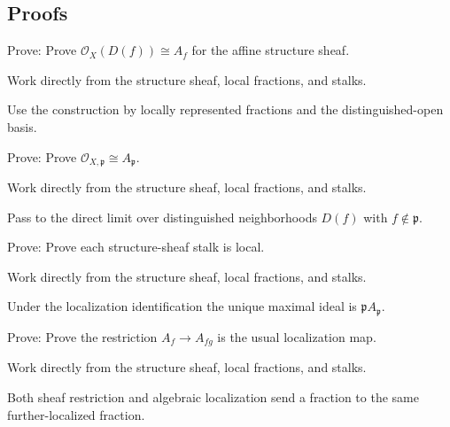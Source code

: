 \subsection*{Proofs}

\begin{exercise}\label{exr:vi17-expand-06}
Prove: Prove $\mathcal O_X(D(f))\cong A_f$ for the affine structure sheaf.
\end{exercise}
\begin{hint}
Work directly from the structure sheaf, local fractions, and stalks.
\end{hint}
\begin{solution}
Use the construction by locally represented fractions and the distinguished-open basis.
\end{solution}

\begin{exercise}\label{exr:vi17-expand-07}
Prove: Prove $\mathcal O_{X,\mathfrak p}\cong A_{\mathfrak p}$.
\end{exercise}
\begin{hint}
Work directly from the structure sheaf, local fractions, and stalks.
\end{hint}
\begin{solution}
Pass to the direct limit over distinguished neighborhoods $D(f)$ with $f\notin\mathfrak p$.
\end{solution}

\begin{exercise}\label{exr:vi17-expand-08}
Prove: Prove each structure-sheaf stalk is local.
\end{exercise}
\begin{hint}
Work directly from the structure sheaf, local fractions, and stalks.
\end{hint}
\begin{solution}
Under the localization identification the unique maximal ideal is $\mathfrak pA_{\mathfrak p}$.
\end{solution}

\begin{exercise}\label{exr:vi17-expand-09}
Prove: Prove the restriction $A_f\to A_{fg}$ is the usual localization map.
\end{exercise}
\begin{hint}
Work directly from the structure sheaf, local fractions, and stalks.
\end{hint}
\begin{solution}
Both sheaf restriction and algebraic localization send a fraction to the same further-localized fraction.
\end{solution}

